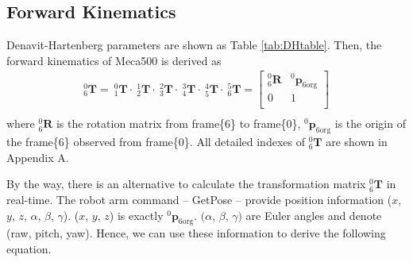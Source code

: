 \subsection*{Forward Kinematics}
\label{sec:forward}
\hspace*{6mm}Denavit-Hartenberg parameters are shown as Table \ref{tab:DHtable}. Then, the forward kinematics of Meca500 is derived as
\begin{equation}
\label{eq:translation matrix}
\begin{split}
^0_6\mathbf{T} =
\ ^0_1\mathbf{T} \cdot \ ^1_2\mathbf{T} \cdot \ ^2_3\mathbf{T} \cdot \ ^3_4\mathbf{T} \cdot \ ^4_5\mathbf{T} \cdot \ ^5_6\mathbf{T} =
\begin{bmatrix}
^0_6\mathbf{R}	&^0\boldsymbol{p}_\mathrm{6org}\\
0				&1\\
\end{bmatrix}\\
\end{split}
\end{equation}
where $^0_6\mathbf{R}$ is the rotation matrix from frame\{6\} to frame\{0\}, $^0\boldsymbol{p}_\mathrm{6org}$ is the origin of the frame\{6\} observed from frame\{0\}. All detailed indexes of $^0_6\mathbf{T}$ are shown in Appendix A.
\par
By the way, there is an alternative to calculate the transformation matrix $^0_6\mathbf{T} $ in real-time. The robot arm command -- GetPose -- provide position information ($x$, $y$, $z$, $\alpha$, $\beta$, $\gamma$). ($x$, $y$, $z$) is exactly $^0\boldsymbol{p}_\mathrm{6org}$. $(\alpha$, $\beta$, $\gamma)$ are Euler angles and denote (raw, pitch, yaw).  Hence, we can use these information to derive the following equation.
